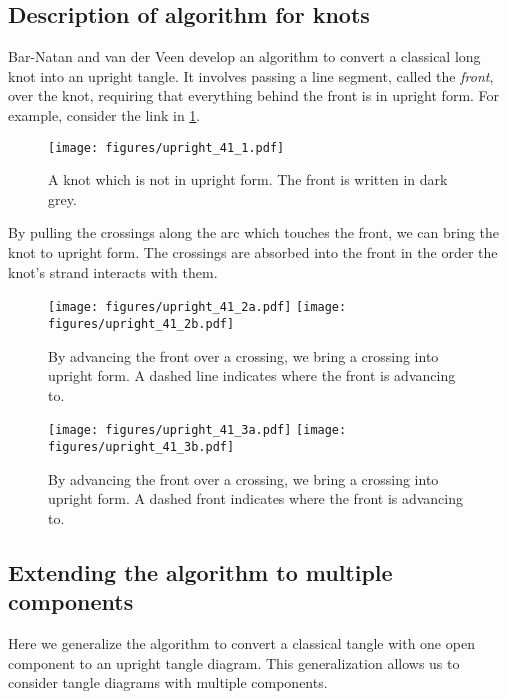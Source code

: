 
\subsection{Description of algorithm for knots}

Bar-Natan and van der Veen develop an algorithm to convert a classical long knot
into an upright tangle. It involves passing a line segment, called the
\emph{front}, over the knot, requiring that everything behind the front is in
upright form. For example, consider the link in \cref{fig:figures-upright_41_1}.
\begin{figure}[h]
        \centering
        \texttt{[image: figures/upright\_41\_1.pdf]}
        \caption{A knot which is not in upright form. The front is written in
        dark grey.}
        \label{fig:figures-upright_41_1}
\end{figure}
By pulling the crossings along the arc which touches the front, we can bring the
knot to upright form. The crossings are absorbed into the front in the order the
knot's strand interacts with them.
\begin{figure}[h]
        \centering
        \texttt{[image: figures/upright\_41\_2a.pdf]}
        \texttt{[image: figures/upright\_41\_2b.pdf]}
        \caption{By advancing the front over a crossing, we bring a crossing
        into upright form. A dashed line indicates where the front is advancing
        to.
        }
        \label{fig:figures-upright_41_2}
\end{figure}
\begin{figure}[h]
        \centering
        \texttt{[image: figures/upright\_41\_3a.pdf]}
        \texttt{[image: figures/upright\_41\_3b.pdf]}
        \caption{By advancing the front over a crossing, we bring a crossing
        into upright form. A dashed front indicates where the front is advancing
        to.
        }
        \label{fig:figures-upright_41_3}
\end{figure}

\subsection{Extending the algorithm to multiple components}

Here we generalize the algorithm to convert a classical tangle with one open
component to an upright tangle diagram. This generalization allows us to
consider tangle diagrams with multiple components.

